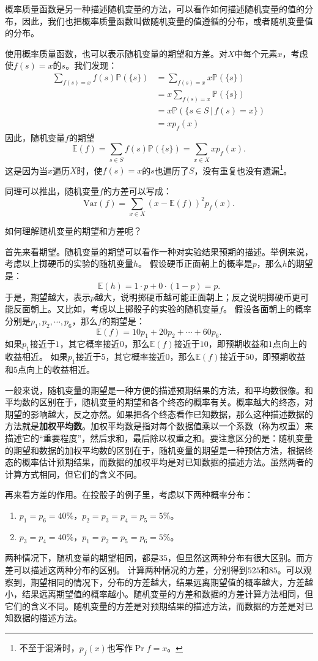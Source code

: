 \documentclass[12pt,UTF8]{ctexbook}
\begin{document}
概率质量函数是另一种描述随机变量的方法，可以看作如何描述随机变量的值的分布，因此，我们也把概率质量函数叫做随机变量的值遵循的分布，或者随机变量值的分布。

使用概率质量函数，也可以表示随机变量的期望和方差。对$X$中每个元素$x$，考虑使$f(s) = x$的$s$。我们发现：
\begin{align*}
    \sum_{f(s) = x} f(s) \mathbb{P}(\{s\}) &= \sum_{f(s) = x} x \mathbb{P}(\{s\})  \\
    &= x \sum_{f(s) = x} \mathbb{P}(\{s\})  \\
    &= x \mathbb{P}(\{s \in S \,|\, f(s) = x\})  \\
    &= x p_f(x)   
\end{align*}
因此，随机变量$f$的期望
$$ \mathbb{E}(f) = \sum_{s\in S} f(s) \mathbb{P}(\{s\}) = \sum_{x \in X} x p_f(x). $$
这是因为当$x$遍历$X$时，使$f(s) = x$的$s$也遍历了$S$，没有重复也没有遗漏\footnote{不至于混淆时，\(p_f(x)\)也写作\(\Pr{f=x}\)。}。

同理可以推出，随机变量$f$的方差可以写成：
$$ \mathrm{Var}(f)  = \sum_{x\in X} \left(x - \mathbb{E}(f)\right)^2 p_f(x).$$ 

如何理解随机变量的期望和方差呢？

首先来看期望。随机变量的期望可以看作一种对实验结果预期的描述。举例来说，考虑以上掷硬币的实验的随机变量$h$。
假设硬币正面朝上的概率是$p$，那么$h$的期望是：
$$ \mathbb{E}(h) = 1\cdot p + 0\cdot (1 - p) = p. $$
于是，期望越大，表示$p$越大，说明掷硬币越可能正面朝上；反之说明掷硬币更可能反面朝上。又比如，考虑以上掷骰子的实验的随机变量$f$。
假设各面朝上的概率分别是$p_1, p_2, \cdots , p_6$，那么$f$的期望是：
$$ \mathbb{E}(f) = 10p_1 + 20p_2 + \cdots + 60p_6. $$
如果$p_1$接近于$1$，其它概率接近$0$，那么$\mathbb{E}(f)$接近于$10$，即预期收益和$1$点向上的收益相近。
如果$p_1$接近于$5$，其它概率接近$0$，那么$\mathbb{E}(f)$接近于$50$，即预期收益和$5$点向上的收益相近。

一般来说，随机变量的期望是一种方便的描述预期结果的方法，和平均数很像。和平均数的区别在于，随机变量的期望和各个终态的概率有关。概率越大的终态，对期望的影响越大，反之亦然。如果把各个终态看作已知数据，那么这种描述数据的方法就是\textbf{加权平均数}。加权平均数是指对每个数据值乘以一个系数（称为权重）来描述它的“重要程度”，然后求和，最后除以权重之和。要注意区分的是：随机变量的期望和数据的加权平均数的区别在于，随机变量的期望是一种预估方法，根据终态的概率估计预期结果，而数据的加权平均是对已知数据的描述方法。虽然两者的计算方式相同，但它们的含义不同。

再来看方差的作用。在投骰子的例子里，考虑以下两种概率分布：
\begin{enumerate}
    \item $p_1 = p_6 = 40\%$，$p_2 = p_3 = p_4 = p_5 = 5\%$。
    \item $p_3 = p_4 = 40\%$，$p_1 = p_2 = p_5 = p_6 = 5\%$。
\end{enumerate}
两种情况下，随机变量的期望相同，都是$35$，但显然这两种分布有很大区别。而方差可以描述这两种分布的区别。
计算两种情况的方差，分别得到$525$和$85$。可以观察到，期望相同的情况下，分布的方差越大，结果远离期望值的概率越大，方差越小，结果远离期望值的概率越小。随机变量的方差和数据的方差计算方法相同，但它们的含义不同。随机变量的方差是对预期结果的描述方法，而数据的方差是对已知数据的描述方法。
\end{document}
